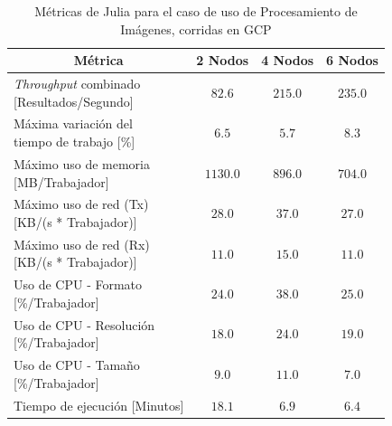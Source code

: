 \documentclass[11pt]{article}
\providecommand{\row}[1]{\parbox{150pt}{\setlength{\baselineskip}{0.2\baselineskip}\strut#1\strut}}
\newcommand{\ipcap}[2]{\caption{Métricas de #1 para el caso de uso de Procesamiento de Imágenes, corridas en #2}}
\newcommand{\english}[1]{\textit{#1}}
\begin{document}
\begin{table}[H]
\centering
\begin{tabular}{|l|c|c|c|}
\hline
\multicolumn{1}{|c|}{Métrica} & 2 Nodos & 4 Nodos & 6 Nodos \\ \hline
\row{\english{Throughput} combinado\\{[Resultados/Segundo]}} & $82.6$ & $215.0$ & $235.0$ \\ \hline
\row{Máxima variación del \\ tiempo de trabajo {[}\%{]}} & $6.5$ & $5.7$ & $8.3$ \\ \hline
\row{Máximo uso de memoria \\ {[MB/Trabajador]}} & $1130.0$ & $896.0$ & $704.0$ \\ \hline
\row{Máximo uso de red (Tx) \\ {[KB/(s * Trabajador)]}} & $28.0$ & $37.0$ & $27.0$ \\ \hline
\row{Máximo uso de red (Rx) \\ {[KB/(s * Trabajador)]}} & $11.0$ & $15.0$ & $11.0$ \\ \hline
\row{Uso de CPU - Formato\\{[\%/Trabajador]}} & $24.0$ & $38.0$ & $25.0$ \\ \hline
\row{Uso de CPU - Resolución\\{[\%/Trabajador]}} & $18.0$ & $24.0$ & $19.0$ \\ \hline
\row{Uso de CPU - Tamaño\\{[\%/Trabajador]}} & $9.0$ & $11.0$ & $7.0$ \\ \hline
Tiempo de ejecución [Minutos] & $18.1$ & $6.9$ & $6.4$ \\ \hline
\end{tabular}
\ipcap{Julia}{GCP}
\end{table}
\end{document}
